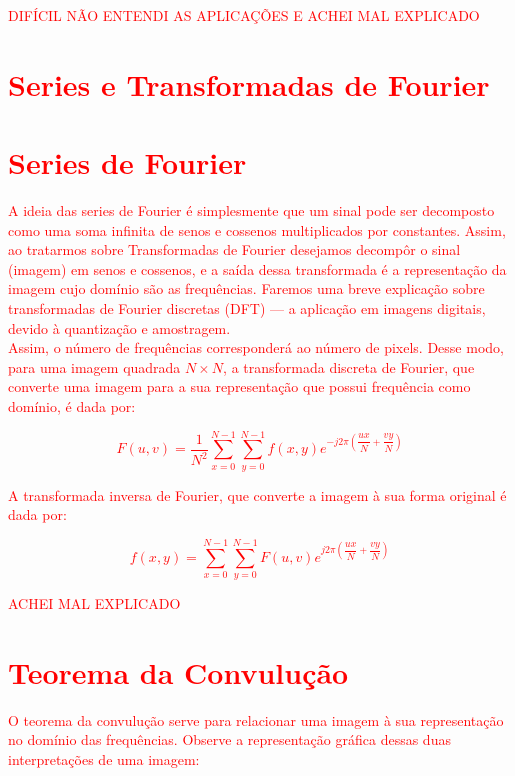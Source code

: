 \documentclass[a4paper, 12pt]{article}
\begin{document}
\textcolor{red}{\large{DIFÍCIL NÃO ENTENDI AS APLICAÇÕES E ACHEI MAL EXPLICADO}
\section{Series e Transformadas de Fourier}
\section{Series de Fourier}
A ideia das series de Fourier é simplesmente que um sinal pode ser decomposto como uma soma infinita de senos e cossenos multiplicados por constantes.
Assim, ao tratarmos sobre Transformadas de Fourier desejamos decompôr o sinal (imagem) em senos e cossenos, e a saída dessa transformada é a representação 
da imagem cujo domínio são as frequências. Faremos uma breve explicação sobre transformadas de Fourier discretas (DFT) --- a aplicação em imagens digitais, 
devido à quantização e amostragem.
\\
Assim, o número de frequências corresponderá ao número de pixels. Desse modo, para uma imagem quadrada $N \times N$, a transformada discreta de Fourier, 
que converte uma imagem para a sua representação que possui frequência como domínio, é dada por:
\begin{center}
	\[F(u,v) = \dfrac{1}{N^2} \sum_{x = 0}^{N-1} \sum_{y=0}^{N-1} f(x,y)e^{-j2\pi\left(\dfrac{ux}{N} + \dfrac{vy}{N}\right)}\]
\end{center}
A transformada inversa de Fourier, que converte a imagem à sua forma original é dada por:
\begin{center}
	\[f(x,y) = \sum_{x = 0}^{N-1} \sum_{y=0}^{N-1} F(u,v)e^{j2\pi\left(\dfrac{ux}{N} + \dfrac{vy}{N}\right)}\]
\end{center}
}
\textcolor{red}{\large{ACHEI MAL EXPLICADO}
\section{Teorema da Convulução}
O teorema da convulução serve para relacionar uma imagem à sua representação no domínio das frequências. Observe a representação gráfica dessas duas 
interpretações de uma imagem:}
\end{document}
